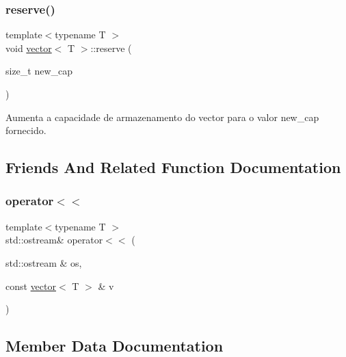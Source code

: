 \mbox{\label{classvector_a187dd0a9042d1e24c08d27d7e1027f06}} 
\subsubsection{\texorpdfstring{reserve()}{reserve()}}
{\footnotesize\ttfamily template$<$typename T $>$ \\
void \hyperlink{classvector}{vector}$<$ T $>$\+::reserve (\begin{DoxyParamCaption}\item[{size\+\_\+t}]{new\+\_\+cap }\end{DoxyParamCaption})\hspace{0.3cm}{\ttfamily [inline]}}



Aumenta a capacidade de armazenamento do vector para o valor {\ttfamily new\+\_\+cap} fornecido. 



\subsection{Friends And Related Function Documentation}
\mbox{\label{classvector_add6bce5bf4a9ad1887f2b17dd4cc4184}} 
\subsubsection{\texorpdfstring{operator$<$$<$}{operator<<}}
{\footnotesize\ttfamily template$<$typename T $>$ \\
std\+::ostream\& operator$<$$<$ (\begin{DoxyParamCaption}\item[{std\+::ostream \&}]{os,  }\item[{const \hyperlink{classvector}{vector}$<$ T $>$ \&}]{v }\end{DoxyParamCaption})\hspace{0.3cm}{\ttfamily [friend]}}



\subsection{Member Data Documentation}
\mbox{\label{classvector_ac3241a0ca844ecb2a31813543a33e6fb}} 

